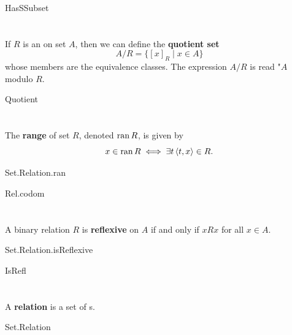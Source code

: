 \documentclass{report}
\begin{document}
    {HasSSubset}

\section{}%

  If $R$ is an  on set $A$, then we can define
    the \textbf{quotient set} $$A / R = \{[x]_R \mid x \in A\}$$ whose members
    are the equivalence classes.
  The expression $A / R$ is read "$A$ modulo $R$.

    {Quotient}

\section{}%

  The \textbf{range} of set $R$, denoted $\mathop{\text{ran}}{R}$, is given by
    $$x \in \mathop{\text{ran}}{R} \iff \exists t \left< t, x \right> \in R.$$

    {Set.Relation.ran}

    {Rel.codom}

\section{}%

  A binary relation $R$ is \textbf{reflexive} on $A$ if and only if $xRx$ for
    all $x \in A$.

    {Set.Relation.isReflexive}

    {IsRefl}

\section{}%

  A \textbf{relation} is a set of s.

    {Set.Relation}


\section{}%
\end{document}
